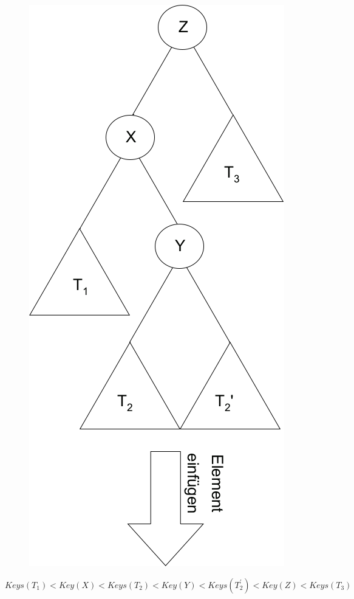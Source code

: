 \begin{figure}
\includegraphics[width=0.9\linewidth]{11/Grafik/img4_doppelRotation_1.png}
\end{figure}

$Keys(T_1) < Key(X) < Keys(T_2) < Key(Y) < Keys(T_2^{'}) < Key(Z) < Keys(T_3)$

